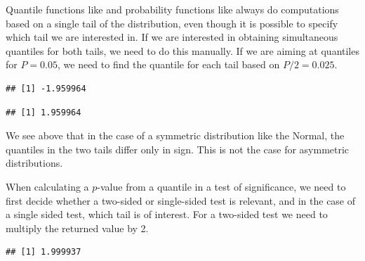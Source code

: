 \documentclass[krantz2]{krantz}\usepackage{knitr}
\begin{document}
\begin{warningbox}
Quantile functions like  and probability functions like  always do computations based on a single tail of the distribution, even though it is possible to specify which tail we are interested in. If we are interested in obtaining simultaneous quantiles for both tails, we need to do this manually. If we are aiming at quantiles for $P = 0.05$, we need to find the quantile for each tail based on $P / 2 = 0.025$.

\begin{knitrout}\footnotesize
{}\color{fgcolor}\begin{kframe}
\begin{alltt}
\hlstd{(} \hlstd{=} \hlstd{,}  \hlstd{=} \hlstd{,}  \hlstd{=} \hlstd{)}
\end{alltt}
\begin{verbatim}
## [1] -1.959964
\end{verbatim}
\begin{alltt}
\hlstd{(} \hlstd{=} \hlstd{,}  \hlstd{=} \hlstd{,}  \hlstd{=} \hlstd{,}  \hlstd{=} \hlstd{)}
\end{alltt}
\begin{verbatim}
## [1] 1.959964
\end{verbatim}
\end{kframe}
\end{knitrout}

We see above that in the case of a symmetric distribution like the Normal, the quantiles in the two tails differ only in sign. This is not the case for asymmetric distributions.

When calculating a $p$-value from a quantile in a test of significance, we need to first decide whether a two-sided or single-sided test is relevant, and in the case of a single sided test, which tail is of interest. For a two-sided test we need to multiply the returned value by 2.

\begin{knitrout}\footnotesize
{}\color{fgcolor}\begin{kframe}
\begin{alltt}
\hlstd{(} \hlstd{=} \hlstd{,}  \hlstd{=} \hlstd{,}  \hlstd{=} \hlstd{)} \hlopt{*} 
\end{alltt}
\begin{verbatim}
## [1] 1.999937
\end{verbatim}
\end{kframe}
\end{knitrout}

\end{warningbox}
\end{document}
